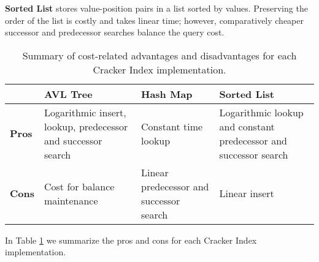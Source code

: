 \textbf{Sorted List} stores value-position pairs in a list sorted by values. Preserving the order of the list is costly and takes linear time; however, comparatively cheaper successor and predecessor searches balance the query cost.

\begin{table}
\begin{tabular}{| m{2em}  | m{2cm} | m{2cm}|  m{2cm} |} 
\hline
 & \textbf{AVL Tree}& \textbf{Hash Map}&\textbf{Sorted List} \\ 
\hline
\textbf{Pros} & Logarithmic insert, lookup, predecessor and successor search & Constant time lookup & Logarithmic lookup and constant predecessor and successor search \\
\hline
\textbf{Cons} & Cost for balance maintenance & Linear predecessor and successor search & Linear insert \\
\hline
\end{tabular}
\caption{Summary of cost-related advantages and disadvantages for each Cracker Index implementation.}
\label{table:implementations}
\end{table}

In Table \ref{table:implementations} we summarize the pros and cons for each Cracker Index implementation.
